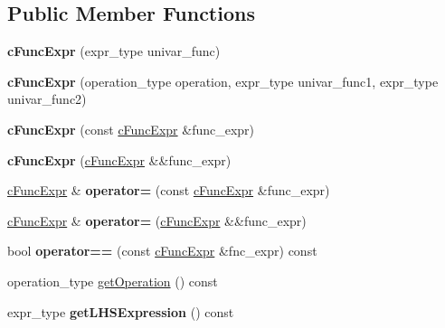 \subsection*{Public Member Functions}
\begin{DoxyCompactItemize}
\item 
\hypertarget{classcFuncExpr_a71288f1b0941126d468680a2a65fcab7}{{\bfseries c\-Func\-Expr} (expr\-\_\-type univar\-\_\-func)}\label{classcFuncExpr_a71288f1b0941126d468680a2a65fcab7}

\item 
\hypertarget{classcFuncExpr_a7843efed00c4ad1d5c63a9a67f735b6c}{{\bfseries c\-Func\-Expr} (operation\-\_\-type operation, expr\-\_\-type univar\-\_\-func1, expr\-\_\-type univar\-\_\-func2)}\label{classcFuncExpr_a7843efed00c4ad1d5c63a9a67f735b6c}

\item 
\hypertarget{classcFuncExpr_ad66bab49b10724c06c928c7f44c1c2e4}{{\bfseries c\-Func\-Expr} (const \hyperlink{classcFuncExpr}{c\-Func\-Expr} \&func\-\_\-expr)}\label{classcFuncExpr_ad66bab49b10724c06c928c7f44c1c2e4}

\item 
\hypertarget{classcFuncExpr_aa08ea2f08807f5b4b117c67d4661af28}{{\bfseries c\-Func\-Expr} (\hyperlink{classcFuncExpr}{c\-Func\-Expr} \&\&func\-\_\-expr)}\label{classcFuncExpr_aa08ea2f08807f5b4b117c67d4661af28}

\item 
\hypertarget{classcFuncExpr_a16da4fe524fb54c6b303cd1c1249b80f}{\hyperlink{classcFuncExpr}{c\-Func\-Expr} \& {\bfseries operator=} (const \hyperlink{classcFuncExpr}{c\-Func\-Expr} \&func\-\_\-expr)}\label{classcFuncExpr_a16da4fe524fb54c6b303cd1c1249b80f}

\item 
\hypertarget{classcFuncExpr_a65cdfa6f9d59359de29e7268b4e3eef5}{\hyperlink{classcFuncExpr}{c\-Func\-Expr} \& {\bfseries operator=} (\hyperlink{classcFuncExpr}{c\-Func\-Expr} \&\&func\-\_\-expr)}\label{classcFuncExpr_a65cdfa6f9d59359de29e7268b4e3eef5}

\item 
\hypertarget{classcFuncExpr_a45aa9930e7835d9a5fa2ba11a2699db9}{bool {\bfseries operator==} (const \hyperlink{classcFuncExpr}{c\-Func\-Expr} \&fnc\-\_\-expr) const }\label{classcFuncExpr_a45aa9930e7835d9a5fa2ba11a2699db9}

\item 
operation\-\_\-type \hyperlink{classcFuncExpr_a169fe0532649d76e93c803ac850c764a}{get\-Operation} () const 
\item 
\hypertarget{classcFuncExpr_a0baf68ae9b7a1402a631eed6a1ff09b4}{expr\-\_\-type {\bfseries get\-L\-H\-S\-Expression} () const }\label{classcFuncExpr_a0baf68ae9b7a1402a631eed6a1ff09b4}


\end{DoxyCompactItemize}
